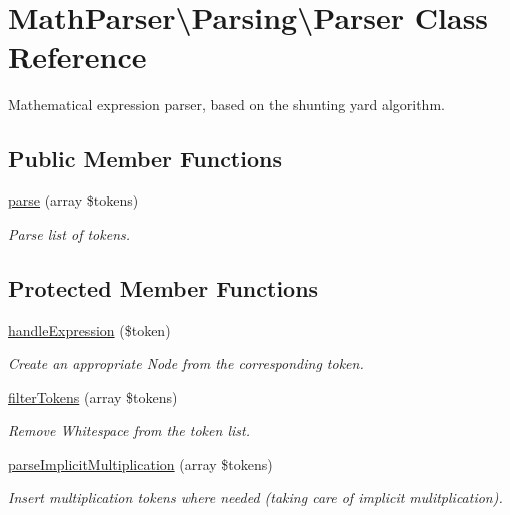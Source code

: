 \hypertarget{classMathParser_1_1Parsing_1_1Parser}{\section{Math\-Parser\textbackslash{}Parsing\textbackslash{}Parser Class Reference}
\label{classMathParser_1_1Parsing_1_1Parser}
}


Mathematical expression parser, based on the shunting yard algorithm.  


\subsection*{Public Member Functions}
\begin{DoxyCompactItemize}
\item 
\hyperlink{classMathParser_1_1Parsing_1_1Parser_a556c64ee108e141b442badafbd3b1164}{parse} (array \$tokens)
\begin{DoxyCompactList}\small\item\em Parse list of tokens. \end{DoxyCompactList}\end{DoxyCompactItemize}
\subsection*{Protected Member Functions}
\begin{DoxyCompactItemize}
\item 
\hyperlink{classMathParser_1_1Parsing_1_1Parser_a2572d3c71a4fd638bb0e9188c2e7f7e9}{handle\-Expression} (\$token)
\begin{DoxyCompactList}\small\item\em Create an appropriate Node from the corresponding token. \end{DoxyCompactList}\item 
\hyperlink{classMathParser_1_1Parsing_1_1Parser_a0896b00bcb6831560faea77f5ff7831c}{filter\-Tokens} (array \$tokens)
\begin{DoxyCompactList}\small\item\em Remove Whitespace from the token list. \end{DoxyCompactList}\item 
\hyperlink{classMathParser_1_1Parsing_1_1Parser_a74e79e5a38c1edbc919cd66c50712cd8}{parse\-Implicit\-Multiplication} (array \$tokens)
\begin{DoxyCompactList}\small\item\em Insert multiplication tokens where needed (taking care of implicit mulitplication). \end{DoxyCompactList}\end{DoxyCompactItemize}
